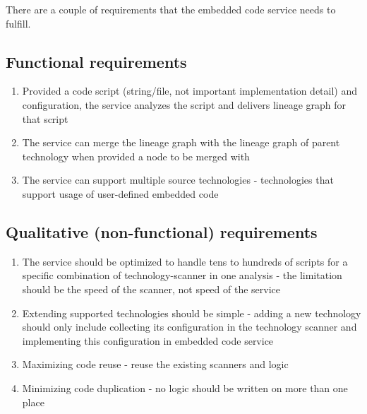 There are a couple of requirements that the embedded code service needs to fulfill. 

\subsection{Functional requirements}
\begin{enumerate}
    \item Provided a code script (string/file, not important implementation detail) and configuration, the service analyzes the script and delivers lineage graph for that script
    \item The service can merge the lineage graph with the lineage graph of parent technology when provided a node to be merged with    
    \item The service can support multiple source technologies - technologies that support usage of user-defined embedded code
\end{enumerate}

\subsection{Qualitative (non-functional) requirements}
\begin{enumerate}
    \item The service should be optimized to handle tens to hundreds of scripts for a specific combination of technology-scanner in one analysis - the limitation should be the speed of the scanner, not speed of the service
    \item Extending supported technologies should be simple - adding a new technology should only include collecting its configuration in the technology scanner and implementing this configuration in embedded code service
    \item Maximizing code reuse - reuse the existing scanners and logic
    \item Minimizing code duplication - no logic should be written on more than one place
\end{enumerate}